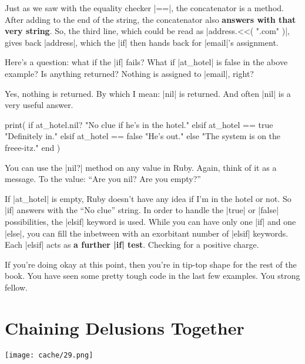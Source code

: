 \documentclass[12pt,twoside]{report}
\begin{document}
Just as we saw with the equality checker
\rubyinline|==|, the concatenator is a method.  After
adding to the end of the string, the concatenator also {\bf answers
  with that very string}.  So, the third line, which could be read as
\rubyinline|address.<<( ".com" )|, gives back
\rubyinline|address|, which the
\rubyinline|if| then hands back for
\rubyinline|email|'s assignment.

Here's a question: what if the \rubyinline|if| fails?
What if \rubyinline|at_hotel| is false in the above
example? Is anything returned?  Nothing is assigned to
\rubyinline|email|, right?

Yes, nothing is returned.  By which I mean:
\rubyinline|nil| is returned.  And often
\rubyinline|nil| is a very useful answer.


\begin{rubycode}

 print( if at_hotel.nil?
          "No clue if he's in the hotel."
        elsif at_hotel == true
          "Definitely in."
        elsif at_hotel == false
          "He's out."
        else
          "The system is on the freee-itz."
        end )

\end{rubycode}


You can use the \rubyinline|nil?| method on any value
in Ruby.  Again, think of it as a message. To the value: ``Are you
nil?  Are you empty?''

If \rubyinline|at_hotel| is empty, Ruby doesn't have
any idea if I'm in the hotel or not.  So
\rubyinline|if| answers with the ``No clue'' string.
In order to handle the \rubyinline|true| or
\rubyinline|false| possibilities, the
\rubyinline|elsif| keyword is used.  While you can
have only one \rubyinline|if| and one
\rubyinline|else|, you can fill the inbetween with an
exorbitant number of \rubyinline|elsif| keywords.
Each \rubyinline|elsif| acts as {\bf a further
  \rubyinline|if| test}.  Checking for a positive
charge.

If you're doing okay at this point, then you're in tip-top shape for
the rest of the book.  You have seen some pretty tough code in the
last few examples.  You strong fellow.


\section{Chaining Delusions Together}


	\texttt{[image: cache/29.png]}
\end{document}
